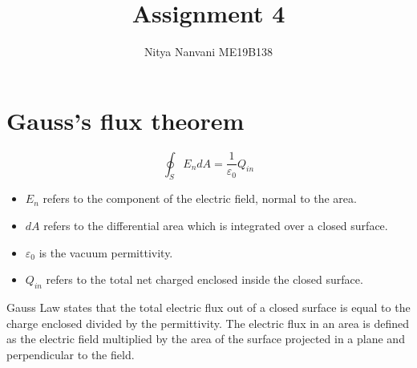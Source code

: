 \documentclass[a4paper, 12pt]{article}
\begin{document}
\title{Assignment 4}
\author{Nitya Nanvani ME19B138}

\maketitle

\section{Gauss's flux theorem}

\begin{equation}
    \oint_S {E_n dA = \frac{1}{{\varepsilon _0 }}} Q_{in}
\end{equation}

\begin{itemize}
	\item $ E_n $  refers to the component of the electric field, normal to the area.
	\item $ dA $  refers to the differential area which is integrated over a closed surface.
	\item $ \varepsilon _0 $ is the vacuum permittivity.
	\item $ Q_{in} $ refers to the total net charged enclosed inside the closed surface.
\end{itemize}
Gauss Law states that the total electric flux out of a closed surface is equal to the charge enclosed divided by the permittivity. The electric flux in an area is defined as the electric field multiplied by the area of the surface projected in a plane and perpendicular to the field.
\end{document}
